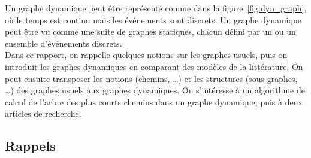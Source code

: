 \documentclass[12pt,a4paper]{article}
\begin{document}
Un graphe dynamique peut être représenté comme dans la
figure~\ref{fig:dyn_graph}, où le temps est continu mais les
événements sont discrets. Un graphe dynamique peut être vu comme une
suite de graphes statiques, chacun défini par un ou un ensemble
d'événements discrets.\\

Dans ce rapport, on rappelle quelques notions sur les graphes usuels,
puis on introduit les graphes dynamiques en comparant des modèles de
la littérature. On peut ensuite transposer les notions (chemins, …)
et les structures (sous-graphes, …) des graphes usuels aux graphes
dynamiques. On s'intéresse à un algorithme de calcul de l'arbre des
plus courts chemins dans un graphe dynamique, puis à deux articles de
recherche.

\subsection{Rappels}
\end{document}
